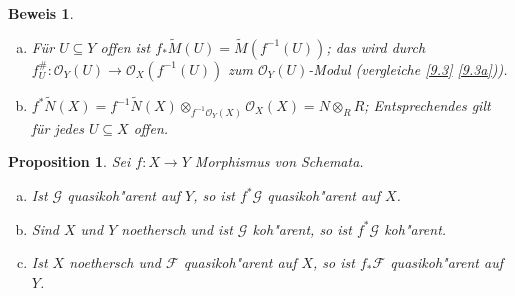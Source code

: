 \documentclass[paper = A4, fontsize=12pt, numbers=noendperiod, chapterprefix=true]{scrbook}
\theoremstyle{break}
\newtheorem{Prop}[Def]{Proposition}
\theoremstyle{nonumberbreak}
\newtheorem{bew}{Beweis}
\theoremstyle{nonumberplain}
\newcommand{\calF}{\mathcal{F}}
\newcommand{\calG}{\mathcal{G}}
\newcommand{\calO}{\mathcal{O}}
\begin{document}
\begin{bew}\begin{enumerate}[a)]
\item
	F\"ur $U \subseteq Y$ offen ist $f_* \tilde M (U) = \tilde M (f^{-1}(U))$; das wird durch $f_U^\#: \calO_Y(U) \to \calO_X(f^{-1}(U))$ zum $\calO_Y(U)$-Modul (vergleiche \ref{9.3} \ref{9.3a})).
\item
	$f^* \tilde N (X) = f^{-1} \tilde N (X) \otimes_{f^{-1} \calO_Y(X)} \calO_X (X) = N \otimes_R R$; Entsprechendes gilt f\"ur jedes $U \subseteq X$ offen.
\end{enumerate}\end{bew}

\begin{Prop}
Sei $f: X \to Y$ Morphismus von Schemata.
\begin{enumerate}[a)]
\item
	Ist $\calG$ quasikoh"arent auf $Y$, so ist $f^*\calG$ quasikoh"arent auf $X$.
\item
	Sind $X$ und $Y$ noethersch und ist $\calG$ koh"arent, so ist $f^*\calG$ koh"arent.
\item
	Ist $X$ noethersch und $\calF$ quasikoh"arent auf $X$, so ist $f_*\calF$ quasikoh"arent auf $Y$.
\end{enumerate}\end{Prop}
\end{document}
